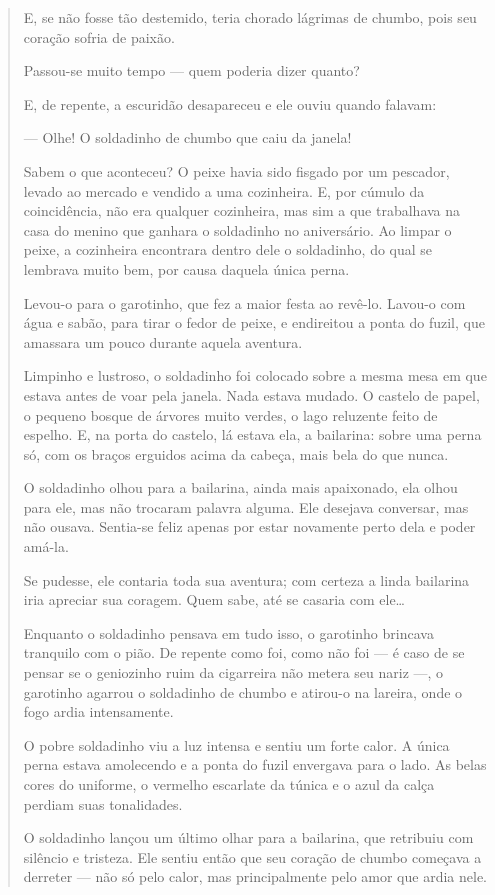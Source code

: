 \begin{quote}
E, se não fosse tão destemido, teria chorado lágrimas de chumbo, pois
seu coração sofria de paixão.

Passou-se muito tempo --- quem poderia dizer quanto?

E, de repente, a escuridão desapareceu e ele ouviu quando falavam:

--- Olhe! O soldadinho de chumbo que caiu da janela!

Sabem o que aconteceu? O peixe havia sido fisgado por um pescador,
levado ao mercado e vendido a uma cozinheira. E, por cúmulo da
coincidência, não era qualquer cozinheira, mas sim a que trabalhava na
casa do menino que ganhara o soldadinho no aniversário. Ao limpar o
peixe, a cozinheira encontrara dentro dele o soldadinho, do qual se
lembrava muito bem, por causa daquela única perna.

Levou-o para o garotinho, que fez a maior festa ao revê-lo. Lavou-o com
água e sabão, para tirar o fedor de peixe, e endireitou a ponta do
fuzil, que amassara um pouco durante aquela aventura.

Limpinho e lustroso, o soldadinho foi colocado sobre a mesma mesa em que
estava antes de voar pela janela. Nada estava mudado. O castelo de
papel, o pequeno bosque de árvores muito verdes, o lago reluzente feito
de espelho. E, na porta do castelo, lá estava ela, a bailarina: sobre
uma perna só, com os braços erguidos acima da cabeça, mais bela do que
nunca.

O soldadinho olhou para a bailarina, ainda mais apaixonado, ela olhou
para ele, mas não trocaram palavra alguma. Ele desejava conversar, mas
não ousava. Sentia-se feliz apenas por estar novamente perto dela e
poder amá-la.

Se pudesse, ele contaria toda sua aventura; com certeza a linda
bailarina iria apreciar sua coragem. Quem sabe, até se casaria com
ele\ldots{}

Enquanto o soldadinho pensava em tudo isso, o garotinho brincava
tranquilo com o pião. De repente como foi, como não foi --- é caso de se
pensar se o geniozinho ruim da cigarreira não metera seu nariz ---, o
garotinho agarrou o soldadinho de chumbo e atirou-o na lareira, onde o
fogo ardia intensamente.

O pobre soldadinho viu a luz intensa e sentiu um forte calor. A única
perna estava amolecendo e a ponta do fuzil envergava para o lado. As
belas cores do uniforme, o vermelho escarlate da túnica e o azul da
calça perdiam suas tonalidades.

O soldadinho lançou um último olhar para a bailarina, que retribuiu com
silêncio e tristeza. Ele sentiu então que seu coração de chumbo começava
a derreter --- não só pelo calor, mas principalmente pelo amor que ardia
nele.


\end{quote}

